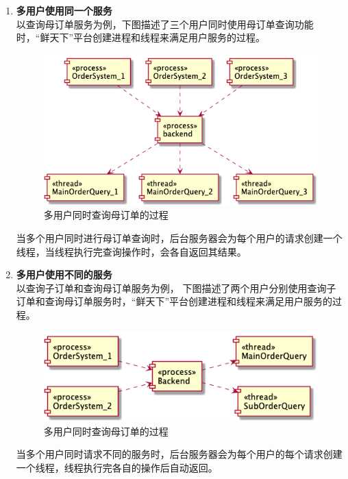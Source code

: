 \begin{enumerate}
    \item \textbf{多用户使用同一个服务}\\以查询母订单服务为例，下图描述了三个用户同时使用母订单查询功能时，“鲜天下”平台创建进程和线程来满足用户服务的过程。
    
    \begin{figure}[htp]
        \centering
        \includegraphics[width=12cm]{report/figure/component/query.png}
        \caption{多用户同时查询母订单的过程}
        \label{fig:query}
    \end{figure}
    
    当多个用户同时进行母订单查询时，后台服务器会为每个用户的请求创建一个线程，当线程执行完查询操作时，会各自返回其结果。
    
    
    \item \textbf{多用户使用不同的服务}\\以查询子订单和查询母订单服务为例， 下图描述了两个用户分别使用查询子订单和查询母订单服务时，“鲜天下”平台创建进程和线程来满足用户服务的过程。
    \begin{figure}[htp]
        \centering
        \includegraphics[width=12cm]{report/figure/component/process.png}
        \caption{多用户同时查询母订单的过程}
        \label{fig:query}
    \end{figure}
    
    \newpage
    当多个用户同时请求不同的服务时，后台服务器会为每个用户的每个请求创建一个线程，线程执行完各自的操作后自动返回。
    
\end{enumerate}

